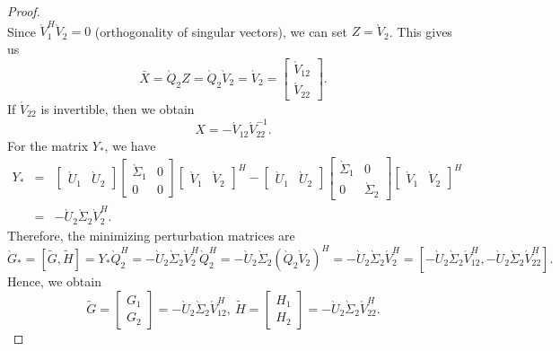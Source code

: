 \documentclass[preprint,11pt,3p]{elsarticle}
\begin{document}
\begin{proof}
\begin{equation*}
\end{equation*}	
Since $\grave{V}_1^H\grave{V}_2=0$ (orthogonality of singular vectors), we can set $Z=\grave{V}_2$. This gives us
	$$\bar{X} = \grave{Q}_2Z=\grave{Q}_2\grave{V}_2=\acute{V}_2=\begin{bmatrix}
		\acute{V}_{12} \\
		\acute{V}_{22}
	\end{bmatrix}.$$
	If $\acute{V}_{22}$ is invertible, then we obtain
	\begin{equation*}
		X=-\acute{V}_{12}\acute{V}_{22}^{-1}.
	\end{equation*}
	For the matrix $Y_{*}$, we have
	\begin{eqnarray*}
		Y_{*} &=& \begin{bmatrix}
			\grave{U}_1 & \grave{U}_2
		\end{bmatrix}\begin{bmatrix}
			\grave{\Sigma}_1 & 0\\
			0 & 0
		\end{bmatrix}\begin{bmatrix}
			\grave{V}_1 & \grave{V}_2
		\end{bmatrix}^H - \begin{bmatrix}
			\grave{U}_1 & \grave{U}_2
		\end{bmatrix}\begin{bmatrix}
			\grave{\Sigma}_1 & 0\\
			0 & \grave{\Sigma}_2
		\end{bmatrix}\begin{bmatrix}
			\grave{V}_1 & \grave{V}_2
		\end{bmatrix}^H \\
		& =& -\grave{U}_2 \grave{\Sigma}_2 \grave{V}_2^H.
	\end{eqnarray*} 
Therefore, the minimizing perturbation matrices are
	\begin{equation*}
		\grave{G}_{*} =[\widetilde{G}, \widetilde{H}]=Y_*\grave{Q}_2^H=-\grave{U}_2 \grave{\Sigma}_2 \grave{V}_2^H \grave{Q}_2^H = -\grave{U}_2 \grave{\Sigma}_2(\grave{Q}_2 \grave{V}_2)^H = -\grave{U}_2 \grave{\Sigma}_2 \acute{V}_2^H = [-\grave{U}_2 \grave{\Sigma}_2 \acute{V}_{12}^H, -\grave{U}_2 \grave{\Sigma}_2 \acute{V}_{22}^H].
	\end{equation*}
	Hence, we obtain
	\begin{equation*}
		\widetilde{G} = \begin{bmatrix}
			G_1 \\ G_2
		\end{bmatrix}= - \grave{U}_2 \grave{\Sigma}_2 \acute{V}_{12}^H, ~   \widetilde{H} = \begin{bmatrix}
			H_1 \\ H_2
		\end{bmatrix}= - \grave{U}_2 \grave{\Sigma}_2 \acute{V}_{22}^H.
	\end{equation*}
\end{proof}
\end{document}

